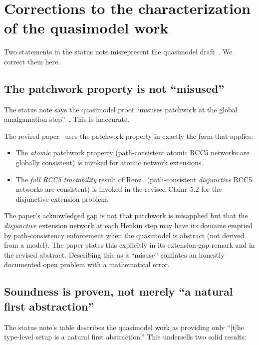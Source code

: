 \documentclass[11pt]{article}
\begin{document}
\section{Corrections to the characterization of the quasimodel work}

Two statements in the status note misrepresent the quasimodel
draft~\cite{Claude2026Quasi}.  We correct them here.

\subsection{The patchwork property is not ``misused''}

The status note says the quasimodel proof ``misuses patchwork at the
global amalgamation step''~\cite[Section~4,
Table]{GPT2026Status}.  This is inaccurate.

The revised paper~\cite{Claude2026Quasi} uses the patchwork property
in exactly the form that applies:
\begin{itemize}
\item The \emph{atomic} patchwork property (path-consistent atomic
  RCC5 networks are globally consistent) is invoked for atomic
  network extensions.
\item The \emph{full RCC5 tractability} result of
  Renz~\cite{Renz1999} (path-consistent \emph{disjunctive} RCC5
  networks are consistent) is invoked in the revised Claim~5.2
  for the disjunctive extension problem.
\end{itemize}

The paper's acknowledged gap is not that patchwork is misapplied
but that the \emph{disjunctive} extension network at each Henkin
step may have its domains emptied by path-consistency enforcement
when the quasimodel is abstract (not derived from a model).
The paper states this explicitly in its extension-gap remark
and in the revised abstract.  Describing this as a ``misuse''
conflates an honestly documented open problem with a mathematical
error.

\subsection{Soundness is proven, not merely ``a natural first
abstraction''}

The status note's table describes the quasimodel work as providing
only ``[t]he type-level setup is a natural first abstraction.''
This undersells two solid results:
\end{document}
